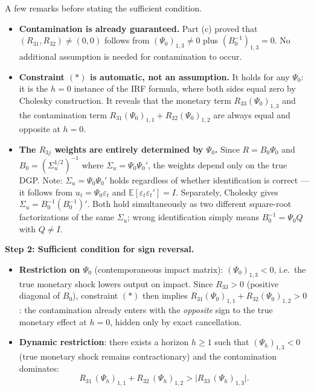 \documentclass[12pt]{article}
\newcommand{\E}{\mathbb E}
\theoremstyle{definition}
\begin{document}
\noindent A few remarks before stating the sufficient condition.
\begin{itemize}
  \item \textbf{Contamination is already guaranteed.} Part (c) proved that $(R_{31},R_{32})\neq(0,0)$ follows from $(\Psi_0)_{1,3}\neq 0$ plus $(B_0^{-1})_{1,3}=0$. No additional assumption is needed for contamination to occur.

  \item \textbf{Constraint $(*)$ is automatic, not an assumption.} It holds for any $\Psi_0$: it is the $h=0$ instance of the IRF formula, where both sides equal zero by Cholesky construction. It reveals that the monetary term $R_{33}(\Psi_0)_{1,3}$ and the contamination term $R_{31}(\Psi_0)_{1,1}+R_{32}(\Psi_0)_{1,2}$ are always equal and opposite at $h=0$.

  \item \textbf{The $R_{3j}$ weights are entirely determined by $\Psi_0$.} Since $R=B_0\Psi_0$ and $B_0=(\Sigma_u^{1/2})^{-1}$ where $\Sigma_u=\Psi_0\Psi_0'$, the weights depend only on the true DGP. Note: $\Sigma_u=\Psi_0\Psi_0'$ holds regardless of whether identification is correct --- it follows from $u_t=\Psi_0\varepsilon_t$ and $\E[\varepsilon_t\varepsilon_t']=I$. Separately, Cholesky gives $\Sigma_u=B_0^{-1}(B_0^{-1})'$. Both hold simultaneously as two different square-root factorizations of the same $\Sigma_u$; wrong identification simply means $B_0^{-1}=\Psi_0 Q$ with $Q\neq I$.
\end{itemize}

\noindent\textbf{Step 2: Sufficient condition for sign reversal.}
\begin{itemize}
  \item \textbf{Restriction on $\Psi_0$} (contemporaneous impact matrix): $(\Psi_0)_{1,3}<0$, i.e.\ the true monetary shock lowers output on impact. Since $R_{33}>0$ (positive diagonal of $B_0$), constraint $(*)$ then implies $R_{31}(\Psi_0)_{1,1}+R_{32}(\Psi_0)_{1,2}>0$: the contamination already enters with the \emph{opposite} sign to the true monetary effect at $h=0$, hidden only by exact cancellation.

  \item \textbf{Dynamic restriction}: there exists a horizon $h\geq 1$ such that $(\Psi_h)_{1,3}<0$ (true monetary shock remains contractionary) and the contamination dominates:
  \[
  R_{31}\,(\Psi_h)_{1,1} + R_{32}\,(\Psi_h)_{1,2} > \bigl|R_{33}\,(\Psi_h)_{1,3}\bigr|.
  \]
\end{itemize}
\end{document}
